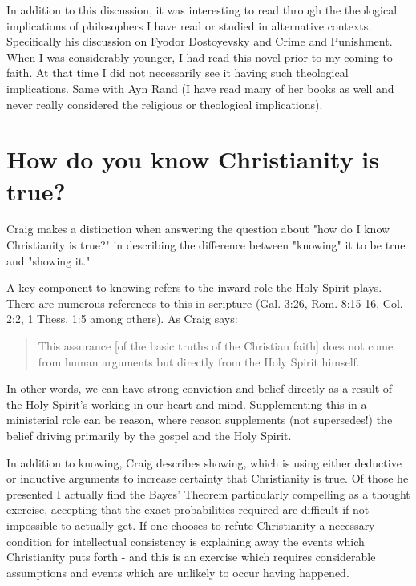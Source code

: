 \documentclass[12pt]{turabian-researchpaper}
\begin{document}
In addition to this discussion, it was interesting to read through the theological implications of philosophers I have read or studied in alternative contexts. Specifically his discussion on Fyodor Dostoyevsky\autocite[pg.68]{craig2008reasonable} and Crime and Punishment. When I was considerably younger, I had read this novel  prior to my coming to faith. At that time I did not necessarily see it having such theological implications. Same with Ayn Rand (I have read many of her books as well and never really considered the religious or theological implications).


\section{How do you know Christianity is true?}

Craig makes a distinction when answering the question about "how do I know Christianity is true?" in describing the difference between "knowing" it to be true and "showing it."

A key component to knowing refers to the inward role the Holy Spirit plays.  There are numerous references to this in scripture (Gal. 3:26, Rom. 8:15-16, Col. 2:2, 1  Thess. 1:5 among others). As Craig says:\autocite[pg.44]{craig2008reasonable}

\begin{quotation}
This assurance [of the basic truths of the Christian faith] does not come from human arguments but directly from the Holy Spirit himself.
\end{quotation}

In other words, we can have strong conviction and belief directly as a result of the Holy Spirit's working in our heart and mind. Supplementing this in a ministerial role can be reason, where reason supplements (not supersedes!) the belief driving primarily by the gospel and the Holy Spirit.

In addition to knowing, Craig describes showing, which is using either deductive or inductive arguments to increase certainty that Christianity is true. Of those he presented I actually find the Bayes' Theorem particularly compelling as a thought exercise, accepting that the exact probabilities required are difficult if not impossible to actually get. If one chooses to refute Christianity a necessary condition for intellectual consistency is explaining away the events which Christianity puts forth - and this is an exercise which requires considerable assumptions and events which are unlikely to occur having happened.
\end{document}
